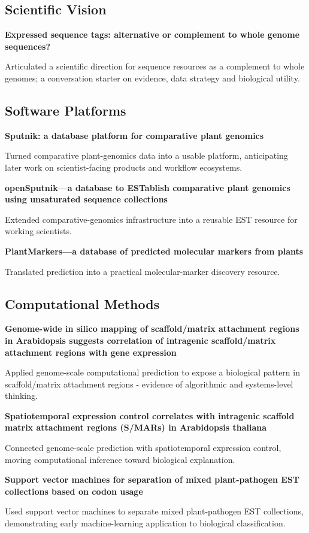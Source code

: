 \subsection*{Scientific Vision}
\textbf{Expressed sequence tags: alternative or complement to whole genome sequences?}\par Articulated a scientific direction for sequence resources as a complement to whole genomes; a conversation starter on evidence, data strategy and biological utility.\par
\subsection*{Software Platforms}
\textbf{Sputnik: a database platform for comparative plant genomics}\par Turned comparative plant-genomics data into a usable platform, anticipating later work on scientist-facing products and workflow ecosystems.\par
\textbf{openSputnik---a database to ESTablish comparative plant genomics using unsaturated sequence collections}\par Extended comparative-genomics infrastructure into a reusable EST resource for working scientists.\par
\textbf{PlantMarkers---a database of predicted molecular markers from plants}\par Translated prediction into a practical molecular-marker discovery resource.\par
\subsection*{Computational Methods}
\textbf{Genome-wide in silico mapping of scaffold/matrix attachment regions in Arabidopsis suggests correlation of intragenic scaffold/matrix attachment regions with gene expression}\par Applied genome-scale computational prediction to expose a biological pattern in scaffold/matrix attachment regions - evidence of algorithmic and systems-level thinking.\par
\textbf{Spatiotemporal expression control correlates with intragenic scaffold matrix attachment regions (S/MARs) in Arabidopsis thaliana}\par Connected genome-scale prediction with spatiotemporal expression control, moving computational inference toward biological explanation.\par
\textbf{Support vector machines for separation of mixed plant-pathogen EST collections based on codon usage}\par Used support vector machines to separate mixed plant-pathogen EST collections, demonstrating early machine-learning application to biological classification.\par
